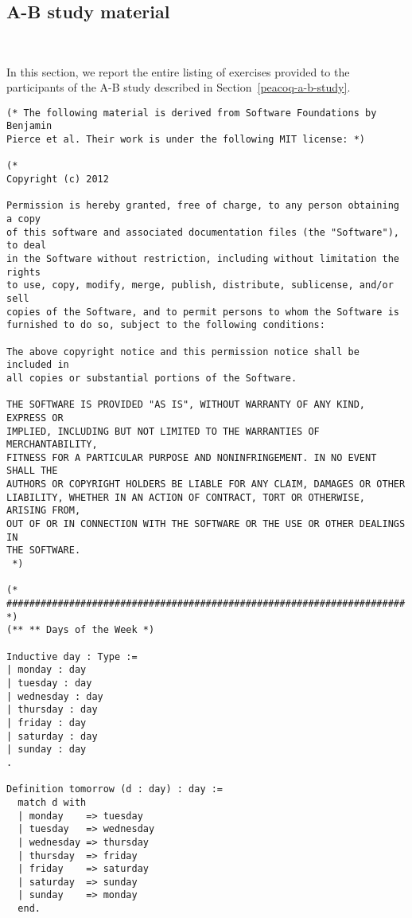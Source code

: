 \chapter{\PeaCoq{}}~\label{appendix-peacoq}

\section{\PeaCoq{} A-B study material}~\label{appendix-peacoq-material}

In this section, we report the entire listing of exercises provided to the participants of the A-B study described in Section~\ref{peacoq-a-b-study}.

\begin{verbatim}
(* The following material is derived from Software Foundations by Benjamin
Pierce et al. Their work is under the following MIT license: *)

(*
Copyright (c) 2012

Permission is hereby granted, free of charge, to any person obtaining a copy
of this software and associated documentation files (the "Software"), to deal
in the Software without restriction, including without limitation the rights
to use, copy, modify, merge, publish, distribute, sublicense, and/or sell
copies of the Software, and to permit persons to whom the Software is
furnished to do so, subject to the following conditions:

The above copyright notice and this permission notice shall be included in
all copies or substantial portions of the Software.

THE SOFTWARE IS PROVIDED "AS IS", WITHOUT WARRANTY OF ANY KIND, EXPRESS OR
IMPLIED, INCLUDING BUT NOT LIMITED TO THE WARRANTIES OF MERCHANTABILITY,
FITNESS FOR A PARTICULAR PURPOSE AND NONINFRINGEMENT. IN NO EVENT SHALL THE
AUTHORS OR COPYRIGHT HOLDERS BE LIABLE FOR ANY CLAIM, DAMAGES OR OTHER
LIABILITY, WHETHER IN AN ACTION OF CONTRACT, TORT OR OTHERWISE, ARISING FROM,
OUT OF OR IN CONNECTION WITH THE SOFTWARE OR THE USE OR OTHER DEALINGS IN
THE SOFTWARE.
 *)

(* ###################################################################### *)
(** ** Days of the Week *)

Inductive day : Type :=
| monday : day
| tuesday : day
| wednesday : day
| thursday : day
| friday : day
| saturday : day
| sunday : day
.

Definition tomorrow (d : day) : day :=
  match d with
  | monday    => tuesday
  | tuesday   => wednesday
  | wednesday => thursday
  | thursday  => friday
  | friday    => saturday
  | saturday  => sunday
  | sunday    => monday
  end.


\end{verbatim}
